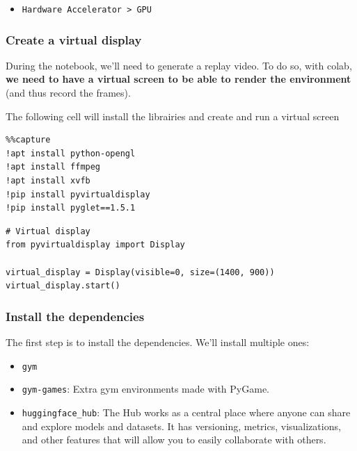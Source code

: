 \documentclass[11pt,a4paper]{article}
\begin{document}

\begin{itemize}
\tightlist
\item
  \texttt{Hardware\ Accelerator\ \textgreater{}\ GPU}
\end{itemize}


\subsubsection{Create a virtual display}\label{create-a-virtual-display}

During the notebook, we'll need to generate a replay video. To do so, with colab, \textbf{we need to have a virtual screen to be able to render the environment} (and thus record the frames).

The following cell will install the librairies and create and run a virtual screen

\begin{lstlisting}
%%capture
!apt install python-opengl
!apt install ffmpeg
!apt install xvfb
!pip install pyvirtualdisplay
!pip install pyglet==1.5.1
\end{lstlisting}

\begin{lstlisting}
# Virtual display
from pyvirtualdisplay import Display

virtual_display = Display(visible=0, size=(1400, 900))
virtual_display.start()
\end{lstlisting}

\subsubsection{Install the dependencies}\label{install-the-dependencies}

The first step is to install the dependencies. We'll install multiple ones:

\begin{itemize}
\tightlist
\item
  \texttt{gym}
\item
  \texttt{gym-games}: Extra gym environments made with PyGame.
\item
  \texttt{huggingface\_hub}: The Hub works as a central place where anyone can share and explore models and datasets. It has versioning, metrics, visualizations, and other features that will allow you to easily collaborate with others.
\end{itemize}
\end{document}
